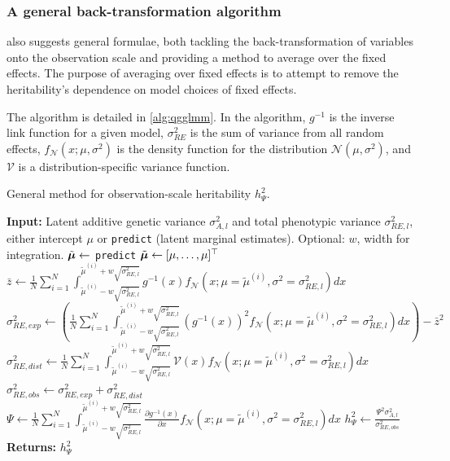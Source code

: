 \subsubsection*{A general back-transformation algorithm}
\textcite{de2016general} also suggests general formulae, both tackling the back-transformation of variables onto the observation scale and providing a method to average over the fixed effects. The purpose of averaging over fixed effects is to attempt to remove the heritability's dependence on model choices of fixed effects. 

The algorithm is detailed in \autoref{alg:qgglmm}. In the algorithm, $g^{-1}$ is the inverse link function for a given model, $\sigma^2_{RE}$ is the sum of variance from all random effects, $f_{\mathcal{N}}(x;\mu,\sigma^2)$ is the density function for the distribution $\mathcal{N}(\mu,\sigma^2)$, and $\mathcal{V}$ is a distribution-specific variance function. 


\begin{algorithm}
\caption{General method for observation-scale heritability $h^2_\Psi$.} \label{alg:qgglmm}
    \begin{algorithmic}
    \State \textbf{Input:} Latent additive genetic variance $\sigma^2_{A,l}$ and total phenotypic variance $\sigma^2_{RE,l}$, either intercept $\mu$ or \texttt{predict} (latent marginal estimates). Optional: $w$, width for integration.
        \State $\Tilde{\bm\mu} \gets$ \texttt{predict}
    \Else
        \State $\Tilde{\bm\mu} \gets [\mu, \dots, \mu]^\top$ 
    \EndIf
    \State $\bar z \gets \frac1N\sum_{i=1}^N \int_{\tilde\mu^{(i)} - w \sqrt{\sigma^2_{RE,l}}}^{\tilde\mu^{(i)} + w \sqrt{\sigma^2_{RE,l}}} g^{-1}(x)f_{\mathcal N}(x; \mu=\tilde\mu^{(i)},\sigma^2=\sigma^2_{RE,l})dx$
    \State $\sigma^2_{RE, exp} \gets \left(\frac1N\sum_{i=1}^N \int_{\tilde\mu^{(i)} - w \sqrt{\sigma^2_{RE,l}}}^{\tilde\mu^{(i)} + w \sqrt{\sigma^2_{RE,l}}} \left(g^{-1}(x)\right)^2 f_{\mathcal N}(x; \mu=\tilde\mu^{(i)},\sigma^2=\sigma^2_{RE,l})dx\right)-\bar z^2$
    \State $\sigma^2_{RE, dist} \gets \frac1N\sum_{i=1}^N \int_{\tilde\mu^{(i)} - w \sqrt{\sigma^2_{RE,l}}}^{\tilde\mu^{(i)} + w \sqrt{\sigma^2_{RE,l}}} \mathcal{V}(x) f_{\mathcal N}(x; \mu=\tilde\mu^{(i)},\sigma^2=\sigma^2_{RE,l})dx$
    \State $\sigma^2_{RE,obs} \gets \sigma^2_{RE, exp} + \sigma^2_{RE, dist}$
    \State $\Psi \gets \frac1N\sum_{i=1}^N \int_{\tilde\mu^{(i)} - w \sqrt{\sigma^2_{RE,l}}}^{\tilde\mu^{(i)} + w \sqrt{\sigma^2_{RE,l}}} \frac{\partial g^{-1}(x)}{\partial x} f_{\mathcal N}(x; \mu=\tilde\mu^{(i)},\sigma^2=\sigma^2_{RE,l})dx$
    \State $h^2_{\Psi} \gets \frac{\Psi^2 \sigma^2_{A,l}}{\sigma^2_{RE,obs}}$
    \State \textbf{Returns: } $h^2_{\Psi}$
    \end{algorithmic}
\end{algorithm}


